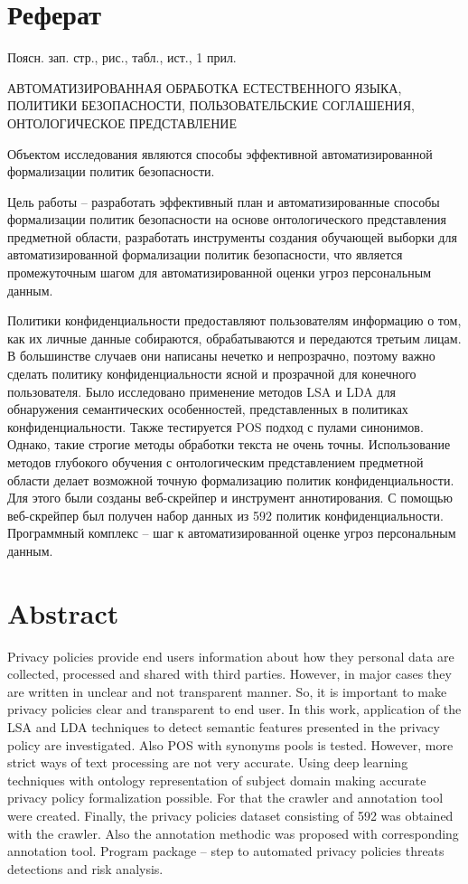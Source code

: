 \documentclass[../main]{subfiles}
\begin{document}
\newpage
{}
\section*{Реферат}
Поясн. зап.  стр.,   рис.,  табл.,  ист., 1 прил.

\begin{jje}
    \MakeUppercase{автоматизированная обработка естественного языка, политики безопасности, пользовательские соглашения, онтологическое представление}
\end{jje}

Объектом  исследования являются способы эффективной автоматизированной формализации политик безопасности.

Цель работы -- разработать эффективный план и автоматизированные способы формализации политик безопасности на основе онтологического представления предметной области, разработать инструменты создания обучающей выборки для автоматизированной формализации политик безопасности, что является промежуточным шагом для автоматизированной оценки угроз персональным данным.

Политики конфиденциальности предоставляют пользователям информацию о том, как их личные данные собираются, обрабатываются и передаются третьим лицам. В большинстве случаев они написаны нечетко и непрозрачно, поэтому важно сделать политику конфиденциальности ясной и прозрачной для конечного пользователя. Было исследовано применение методов LSA и LDA для обнаружения семантических особенностей, представленных в политиках конфиденциальности. Также тестируется POS подход с пулами синонимов. Однако, такие строгие методы обработки текста не очень точны. Использование методов глубокого обучения с онтологическим представлением предметной области делает возможной точную формализацию политик конфиденциальности. Для этого были созданы веб-скрейпер и инструмент аннотирования. С помощью веб-скрейпер был получен набор данных из 592 политик конфиденциальности. Программный комплекс -- шаг к автоматизированной оценке угроз персональным данным.

\newpage
\section*{Abstract}
Privacy policies provide end users information about how they personal data are collected, processed and shared with third parties. However, in major cases they are written in unclear and not transparent manner. So, it is important to make privacy  policies clear and transparent to end user. In this work, application of the LSA and LDA techniques to detect semantic features presented in the privacy policy are investigated. Also POS with synonyms pools is tested. However, more strict ways of text processing are not very accurate. Using deep learning techniques with ontology representation of subject domain making accurate privacy policy formalization possible. For that the crawler and annotation tool were created. Finally, the privacy policies dataset consisting of 592 was obtained with the crawler. Also the annotation methodic was proposed with corresponding annotation tool. Program package -- step to automated privacy policies threats detections and risk analysis.
\end{document}
